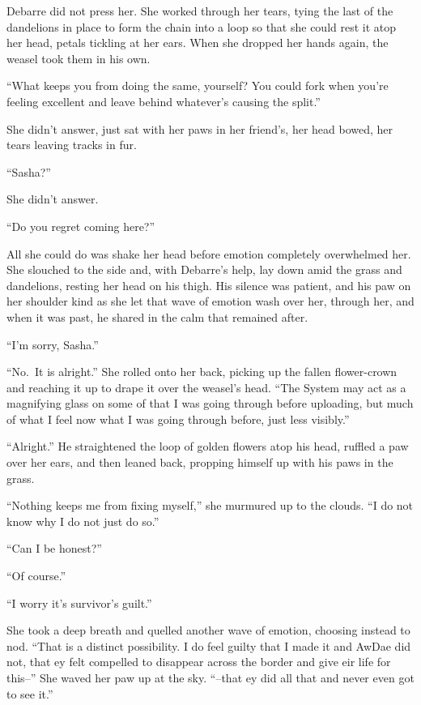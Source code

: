 Debarre did not press her. She worked through her tears, tying the last of the dandelions in place to form the chain into a loop so that she could rest it atop her head, petals tickling at her ears. When she dropped her hands again, the weasel took them in his own.

``What keeps you from doing the same, yourself? You could fork when you're feeling excellent and leave behind whatever's causing the split.''

She didn't answer, just sat with her paws in her friend's, her head bowed, her tears leaving tracks in fur.

``Sasha?''

She didn't answer.

``Do you regret coming here?''

All she could do was shake her head before emotion completely overwhelmed her. She slouched to the side and, with Debarre's help, lay down amid the grass and dandelions, resting her head on his thigh. His silence was patient, and his paw on her shoulder kind as she let that wave of emotion wash over her, through her, and when it was past, he shared in the calm that remained after.

``I'm sorry, Sasha.''

``No.~It is alright.'' She rolled onto her back, picking up the fallen flower-crown and reaching it up to drape it over the weasel's head. ``The System may act as a magnifying glass on some of that I was going through before uploading, but much of what I feel now what I was going through before, just less visibly.''

``Alright.'' He straightened the loop of golden flowers atop his head, ruffled a paw over her ears, and then leaned back, propping himself up with his paws in the grass.

``Nothing keeps me from fixing myself,'' she murmured up to the clouds. ``I do not know why I do not just do so.''

``Can I be honest?''

``Of course.''

``I worry it's survivor's guilt.''

She took a deep breath and quelled another wave of emotion, choosing instead to nod. ``That is a distinct possibility. I do feel guilty that I made it and AwDae did not, that ey felt compelled to disappear across the border and give eir life for this--'' She waved her paw up at the sky. ``--that ey did all that and never even got to see it.''

